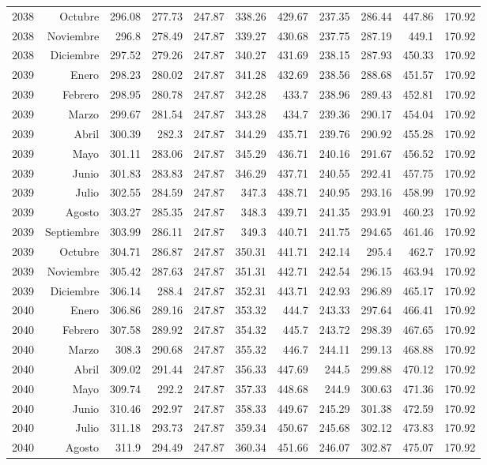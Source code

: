 \documentclass{article}%
\begin{document}
\begin{longtable}{|l r|r|r|r|r|r|r|r|r|r|}
2038&Octubre&296.08&277.73&247.87&338.26&429.67&237.35&286.44&447.86&170.92\\%
2038&Noviembre&296.8&278.49&247.87&339.27&430.68&237.75&287.19&449.1&170.92\\%
2038&Diciembre&297.52&279.26&247.87&340.27&431.69&238.15&287.93&450.33&170.92\\%
2039&Enero&298.23&280.02&247.87&341.28&432.69&238.56&288.68&451.57&170.92\\%
2039&Febrero&298.95&280.78&247.87&342.28&433.7&238.96&289.43&452.81&170.92\\%
2039&Marzo&299.67&281.54&247.87&343.28&434.7&239.36&290.17&454.04&170.92\\%
2039&Abril&300.39&282.3&247.87&344.29&435.71&239.76&290.92&455.28&170.92\\%
2039&Mayo&301.11&283.06&247.87&345.29&436.71&240.16&291.67&456.52&170.92\\%
2039&Junio&301.83&283.83&247.87&346.29&437.71&240.55&292.41&457.75&170.92\\%
2039&Julio&302.55&284.59&247.87&347.3&438.71&240.95&293.16&458.99&170.92\\%
2039&Agosto&303.27&285.35&247.87&348.3&439.71&241.35&293.91&460.23&170.92\\%
2039&Septiembre&303.99&286.11&247.87&349.3&440.71&241.75&294.65&461.46&170.92\\%
2039&Octubre&304.71&286.87&247.87&350.31&441.71&242.14&295.4&462.7&170.92\\%
2039&Noviembre&305.42&287.63&247.87&351.31&442.71&242.54&296.15&463.94&170.92\\%
2039&Diciembre&306.14&288.4&247.87&352.31&443.71&242.93&296.89&465.17&170.92\\%
2040&Enero&306.86&289.16&247.87&353.32&444.7&243.33&297.64&466.41&170.92\\%
2040&Febrero&307.58&289.92&247.87&354.32&445.7&243.72&298.39&467.65&170.92\\%
2040&Marzo&308.3&290.68&247.87&355.32&446.7&244.11&299.13&468.88&170.92\\%
2040&Abril&309.02&291.44&247.87&356.33&447.69&244.5&299.88&470.12&170.92\\%
2040&Mayo&309.74&292.2&247.87&357.33&448.68&244.9&300.63&471.36&170.92\\%
2040&Junio&310.46&292.97&247.87&358.33&449.67&245.29&301.38&472.59&170.92\\%
2040&Julio&311.18&293.73&247.87&359.34&450.67&245.68&302.12&473.83&170.92\\%
2040&Agosto&311.9&294.49&247.87&360.34&451.66&246.07&302.87&475.07&170.92\\%

\end{longtable}
\end{document}
